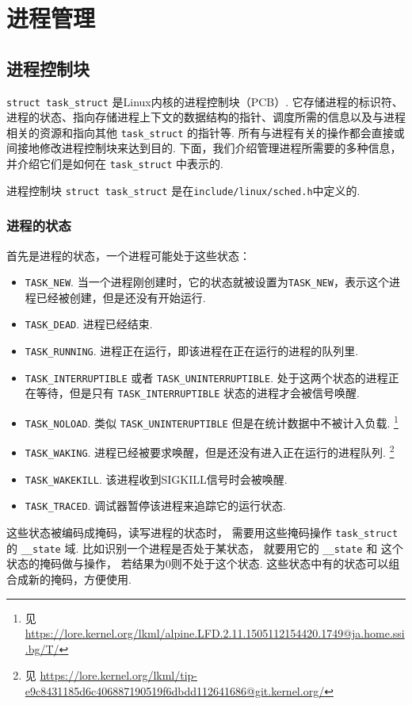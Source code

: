 \section{进程管理}

\subsection{进程控制块}
\lstinline{struct task_struct} 是Linux内核的进程控制块（PCB）.
它存储进程的标识符、进程的状态、指向存储进程上下文的数据结构的指针、调度所需的信息以及与进程相关的资源和指向其他 \lstinline{task_struct} 的指针等.
所有与进程有关的操作都会直接或间接地修改进程控制块来达到目的.
下面，我们介绍管理进程所需要的多种信息，并介绍它们是如何在 \lstinline{task_struct} 中表示的.

\begin{readsrcbox}{进程控制块}
	\lstinline{struct task_struct} 是在\lstinline{include/linux/sched.h}中定义的.
\end{readsrcbox}

\subsubsection{进程的状态}
首先是进程的状态，一个进程可能处于这些状态：
\begin{itemize}
	\item \lstinline{TASK_NEW}.
	      当一个进程刚创建时，它的状态就被设置为\lstinline{TASK_NEW}，表示这个进程已经被创建，但是还没有开始运行.
	\item \lstinline{TASK_DEAD}.
	      进程已经结束.
	\item \lstinline{TASK_RUNNING}.
	      进程正在运行，即该进程在正在运行的进程的队列里.
	\item \lstinline{TASK_INTERRUPTIBLE} 或者 \lstinline{TASK_UNINTERRUPTIBLE}.
	      处于这两个状态的进程正在等待，但是只有 \lstinline{TASK_INTERRUPTIBLE} 状态的进程才会被信号唤醒.
	\item \lstinline{TASK_NOLOAD}.
	      类似 \lstinline{TASK_UNINTERUPTIBLE} 但是在统计数据中不被计入负载.
	      \footnote{见 \url{https://lore.kernel.org/lkml/alpine.LFD.2.11.1505112154420.1749@ja.home.ssi.bg/T/}}
	\item \lstinline{TASK_WAKING}.
	      进程已经被要求唤醒，但是还没有进入正在运行的进程队列.
	      \footnote{见 \url{https://lore.kernel.org/lkml/tip-e9c8431185d6c406887190519f6dbdd112641686@git.kernel.org/}}
	\item \lstinline{TASK_WAKEKILL}.
	      该进程收到SIGKILL信号时会被唤醒.
	\item \lstinline{TASK_TRACED}.
	      调试器暂停该进程来追踪它的运行状态.
\end{itemize}
这些状态被编码成掩码，读写进程的状态时，
需要用这些掩码操作 \lstinline{task_struct} 的 \lstinline{__state} 域.
比如识别一个进程是否处于某状态，
就要用它的 \lstinline{__state} 和 这个状态的掩码做与操作，
若结果为0则不处于这个状态.
这些状态中有的状态可以组合成新的掩码，方便使用.

